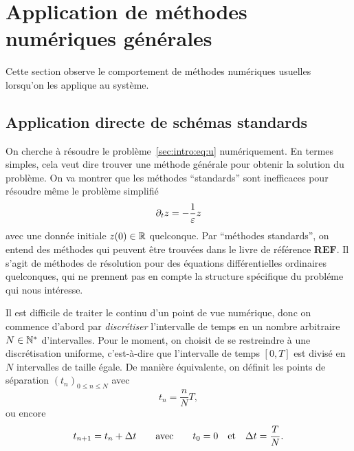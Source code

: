 \section*{Application de méthodes numériques générales}

Cette section observe le comportement de méthodes numériques usuelles
lorsqu'on les applique au système.

\subsection*{Application directe de schémas standards}


On cherche à résoudre le problème~\eqref{sec:intro:eq:u} numériquement.
En termes simples, cela veut dire trouver une méthode générale pour
obtenir la solution du problème. On va montrer que les méthodes
\enquote{standards} sont inefficaces pour résoudre même le problème
simplifié 
\begin{equation} \label{sec:intro:eq:pb_zlin}
    \partial_t z = -\frac{1}{\varepsilon}z
\end{equation}
avec une donnée initiale $z(0) \in \mathbb{R}$ quelconque. Par
\enquote{méthodes standards}, on entend des méthodes qui peuvent être
trouvées dans le livre de référence \textbf{REF}.
Il s'agit de méthodes de résolution pour des équations différentielles
ordinaires quelconques, qui ne prennent pas en compte la structure
spécifique du probléme qui nous intéresse. 


Il est difficile de traiter le continu d'un point de vue numérique, donc
on commence d'abord par \textit{discrétiser} l'intervalle de temps en un
nombre arbitraire $N \in \mathbb{N}^*$ d'intervalles.
%
%
\noindent%
Pour le moment, on choisit de se restreindre à une discrétisation
uniforme, c'est-à-dire que l'intervalle de temps $[0,T]$ est divisé en
$N$ intervalles de taille égale. De manière équivalente, on définit les
points de séparation $(t_n)_{0 \leq n \leq N}$ avec 
\begin{equation*}
    t_n = \frac{n}{N} T ,
\end{equation*}
ou encore 
\begin{equation*}
    t_{n+1} = t_n + \Delta t
    \qquad\text{avec}\qquad
    t_0 = 0 \quad\text{et}\quad \Delta t = \frac{T}{N} .
\end{equation*}

